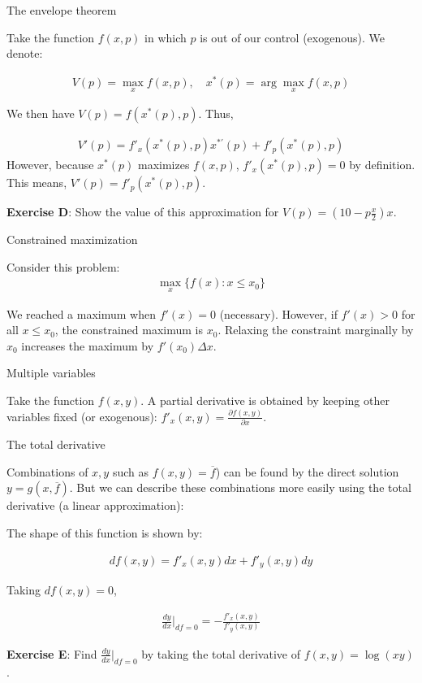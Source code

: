 \documentclass[handout]{beamer}
\begin{document}
\begin{frame}{The envelope theorem}

Take the function $f(x,p)$ in which $p$ is out of our control (exogenous). We denote:

\begin{eqnarray*}
 V(p) = \max_x f(x,p) , \quad x^*(p) = \arg \max_x f(x,p)
\end{eqnarray*}

We then have $V(p) = f(x^*(p),p)$. Thus, 

\begin{eqnarray}
V'(p) = f'_x(x^*(p),p)x^{*'}(p) + f'_p(x^*(p),p)
\end{eqnarray}
However, because $x^*(p)$ maximizes $f(x,p)$, $f'_x(x^*(p),p) = 0$ by definition. This means, $V'(p) = f'_p(x^*(p),p)$.  

\textbf{Exercise D}: Show the value of this approximation for $V(p) = (10 - p\frac{x}{2})x$. 
\end{frame}

\begin{frame}{Constrained maximization}

Consider this problem: 
\begin{eqnarray*}
	\max_x \{f(x):x \leq x_0\}
\end{eqnarray*}

We reached a maximum when $f'(x)=0$ (necessary). However, if $f'(x)>0 $ for all $ x \leq x_0$, the constrained maximum is $x_0$. Relaxing the constraint marginally by $x_0$ increases the maximum by $f'(x_0)\Delta x$.  


\end{frame}

\begin{frame}{Multiple variables}

Take the function $f(x,y)$. A partial derivative is obtained by keeping other variables fixed (or exogenous): $f'_x(x,y) = \frac{\partial f(x,y)}{\partial x}$.

\end{frame}

\begin{frame}{The total derivative}

Combinations of $x,y$ such as $f(x,y) = \overline{f}$) can be found by the direct solution $y=g(x,\overline{f})$. But we can describe these combinations more easily using the total derivative (a linear approximation): 

The shape of this function is shown by: 

\begin{eqnarray*}
df(x,y) = f'_x(x,y)dx + f'_y(x,y)dy
\end{eqnarray*}

Taking $df(x,y)=0$, 

\begin{eqnarray*}
\frac{dy}{dx}\Bigr|_{df=0} = -\frac{f'_x(x,y)}{f'_y(x,y)}
\end{eqnarray*}
 
\textbf{Exercise E}: Find $\frac{dy}{dx}\Bigr|_{df=0}$ by taking the total derivative of $f(x,y)=\log(xy)$. 
\end{frame}
\end{document}

